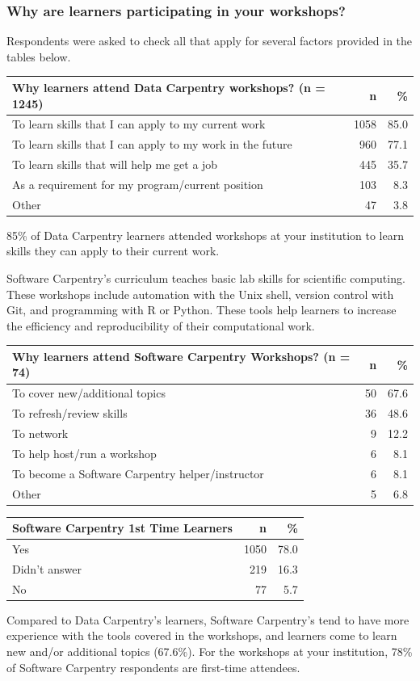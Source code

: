 \documentclass[]{article}
\begin{document}
\subsubsection{Why are learners participating in your
workshops?}\label{why-are-learners-participating-in-your-workshops}

Respondents were asked to check all that apply for several factors
provided in the tables below.

\begin{longtable}[]{@{}lrr@{}}
\toprule
Why learners attend Data Carpentry workshops? (n = 1245) & n &
\%\tabularnewline
\midrule
\endhead
To learn skills that I can apply to my current work & 1058 &
85.0\tabularnewline
To learn skills that I can apply to my work in the future & 960 &
77.1\tabularnewline
To learn skills that will help me get a job & 445 & 35.7\tabularnewline
As a requirement for my program/current position & 103 &
8.3\tabularnewline
Other & 47 & 3.8\tabularnewline
\bottomrule
\end{longtable}

85\% of Data Carpentry learners attended workshops at your institution
to learn skills they can apply to their current work.

Software Carpentry's curriculum teaches basic lab skills for scientific
computing. These workshops include automation with the Unix shell,
version control with Git, and programming with R or Python. These tools
help learners to increase the efficiency and reproducibility of their
computational work.

\begin{longtable}[]{@{}lrr@{}}
\toprule
Why learners attend Software Carpentry Workshops? (n = 74) & n &
\%\tabularnewline
\midrule
\endhead
To cover new/additional topics & 50 & 67.6\tabularnewline
To refresh/review skills & 36 & 48.6\tabularnewline
To network & 9 & 12.2\tabularnewline
To help host/run a workshop & 6 & 8.1\tabularnewline
To become a Software Carpentry helper/instructor & 6 &
8.1\tabularnewline
Other & 5 & 6.8\tabularnewline
\bottomrule
\end{longtable}

\begin{longtable}[]{@{}lrr@{}}
\toprule
Software Carpentry 1st Time Learners & n & \%\tabularnewline
\midrule
\endhead
Yes & 1050 & 78.0\tabularnewline
Didn't answer & 219 & 16.3\tabularnewline
No & 77 & 5.7\tabularnewline
\bottomrule
\end{longtable}

Compared to Data Carpentry's learners, Software Carpentry's tend to have
more experience with the tools covered in the workshops, and learners
come to learn new and/or additional topics (67.6\%). For the workshops
at your institution, 78\% of Software Carpentry respondents are
first-time attendees.
\end{document}
